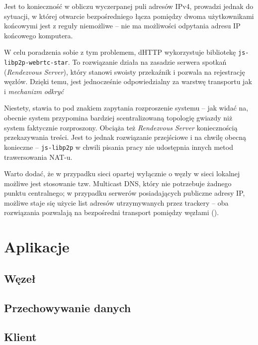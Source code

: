 Jest to konieczność w obliczu wyczerpanej puli adresów IPv4, prowadzi jednak do sytuacji, w której otwarcie bezpośredniego łącza pomiędzy dwoma użytkownikami końcowymi jest z reguły niemożliwe -- nie ma możliwości odpytania adresu IP końcowego komputera.

W celu poradzenia sobie z tym problemem, dHTTP wykorzystuje bibliotekę \texttt{js-libp2p-webrtc-star}. To rozwiązanie działa na zasadzie serwera spotkań ({\em Rendezvous Server}), który stanowi swoisty przekaźnik i pozwala na rejestrację węzłów. Dzięki temu, jest jednocześnie odpowiedzialny za warstwę transportu jak i {\em mechanizm odkryć}

Niestety, stawia to pod znakiem zapytania rozproszenie systemu -- jak widać na,
obecnie system przypomina bardziej scentralizowaną topologię gwiazdy niż system faktycznie rozproszony. Obciąża też {\em Rendezvous Server} koniecznością przekazywania treści. Jest to jednak rozwiązanie przejściowe i na chwilę obecną konieczne -- \texttt{js-libp2p} w chwili pisania pracy nie udostępnia innych metod trawersowania NAT-u.

Warto dodać, że w przypadku sieci opartej wyłącznie o węzły w sieci lokalnej możliwe jest stosowanie tzw. Multicast DNS, który nie potrzebuje żadnego punktu centralnego; w przypadku serwerów posiadających publiczne adresy IP, możliwe staje się użycie list adresów utrzymywanych przez trackery -- oba rozwiązania pozwalają na bezpośredni transport pomiędzy węzłami (\cite{discoverylibp2p}).

\section{Aplikacje}

\subsection{Węzeł}

\subsection{Przechowywanie danych}
\label{sec:dataPropagation}

\subsection{Klient}



